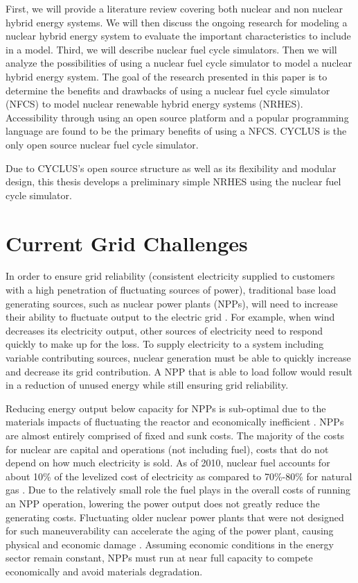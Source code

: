 \documentclass[12pt]{UIdahoMastersThesis}
\begin{document}
First, we will provide a literature review covering both nuclear and non nuclear hybrid energy systems.  We will then discuss the ongoing research for modeling a nuclear hybrid energy system to evaluate the important characteristics to include in a model. Third, we will describe nuclear fuel cycle simulators. Then we will analyze the possibilities of using a nuclear fuel cycle simulator to model a nuclear hybrid energy system. The goal of the research presented in this paper is to determine the benefits and drawbacks of using a nuclear fuel cycle simulator (NFCS) to model nuclear renewable hybrid energy systems (NRHES).  Accessibility through using an open source platform and a popular programming language are found to be the primary benefits of using a NFCS. CYCLUS is the only open source nuclear fuel cycle simulator. 

Due to CYCLUS's open source structure as well as its flexibility and modular design, this thesis develops a preliminary simple NRHES using the nuclear fuel cycle simulator. 

\section{Current Grid Challenges}
In order to ensure grid reliability (consistent electricity supplied to customers with a high penetration of fluctuating sources of power), traditional base load generating sources, such as nuclear power plants (NPPs), will need to increase their ability to fluctuate output to the electric grid \cite {Denholm2011}. For example, when wind decreases its electricity output, other sources of electricity need to respond quickly to make up for the loss. To supply electricity to a system including variable contributing sources, nuclear generation must be able to quickly increase and decrease its grid contribution. A NPP that is able to load follow would result in a reduction of unused energy while still ensuring grid reliability.

Reducing energy output below capacity for NPPs is sub-optimal due to the materials impacts of fluctuating the reactor and economically inefficient \cite{Nuclear2011}. NPPs are almost entirely comprised of fixed and sunk costs. The majority of the costs for nuclear are capital and operations (not including fuel), costs that do not depend on how much electricity is sold. As of 2010, nuclear fuel accounts for about 10\% of the levelized cost of electricity as compared to 70\%-80\% for natural gas \cite{IEA/NEA}. Due to the relatively small role the fuel plays in the overall costs of running an NPP operation, lowering the power output does not greatly reduce the generating costs. Fluctuating older nuclear power plants that were not designed for such maneuverability can accelerate the aging of the power plant, causing physical and economic damage \cite{Nuclear2011}. Assuming economic conditions in the energy sector remain constant, NPPs must run at near full capacity to compete economically and avoid materials degradation.
\end{document}
